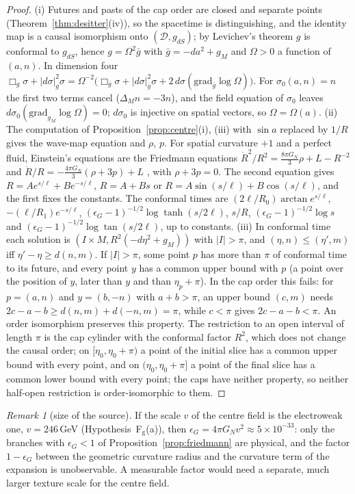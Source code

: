 \documentclass[aps,pra,onecolumn,superscriptaddress,nofootinbib,10pt]{revtex4-2}
\theoremstyle{definition}
\theoremstyle{remark}
\newtheorem{remark}[theorem]{Remark}
\newcommand{\cD}{\mathcal{D}}
\begin{document}
\begin{proof}
(i) Futures and pasts of the cap order are closed and separate points (Theorem~\ref{thm:desitter}(iv)), so the
spacetime is distinguishing, and the identity map is a causal isomorphism onto $(\cD,g_{dS})$; by Levichev's
theorem \cite{Levichev87} $g$ is conformal to $g_{dS}$, hence $g=\Omega^2\bar g$ with $\bar g=-da^2+g_M$ and $\Omega>0$ a
function of $(a,n)$.  In dimension four $\Box_g\sigma+\lvert d\sigma\rvert_g^2\sigma=\Omega^{-2}\bigl(\Box_{\bar g}\sigma+\lvert d\sigma\rvert_{\bar g}^2\sigma+2\,d\sigma(\mathrm{grad}_{\bar g}\log\Omega)\bigr)$.  For
$\sigma_0(a,n)=n$ the first two terms cancel ($\Delta_Mn=-3n$), and the field equation of $\sigma_0$ leaves
$d\sigma_0(\mathrm{grad}_{g_M}\log\Omega)=0$; $d\sigma_0$ is injective on spatial vectors, so $\Omega=\Omega(a)$.
(ii) The computation of Proposition~\ref{prop:centre}(i), (iii) with $\sin a$ replaced by $1/R$ gives the
wave-map equation and $\rho$, $p$.  For spatial curvature $+1$ and a perfect fluid, Einstein's equations
are the Friedmann equations $\dot R^2/R^2=\tfrac{8\pi G_N}3\rho+L-R^{-2}$ and
$\ddot R/R=-\tfrac{4\pi G_N}3(\rho+3p)+L$ \cite{HawkingEllis}, with $\rho+3p=0$.  The second equation gives
$R=Ae^{s/\ell}+Be^{-s/\ell}$, $R=A+Bs$ or $R=A\sin(s/\ell)+B\cos(s/\ell)$, and the first fixes the constants.  The
conformal times are $(2\ell/R_0)\arctan e^{s/\ell}$, $-(\ell/R_1)e^{-s/\ell}$, $(\epsilon_G-1)^{-1/2}\log\tanh(s/2\ell)$,
$s/R$, $(\epsilon_G-1)^{-1/2}\log s$ and $(\epsilon_G-1)^{-1/2}\log\tan(s/2\ell)$, up to constants.
(iii) In conformal time each solution is $(I\times M,R^2(-d\eta^2+g_M))$ with $\lvert I\rvert>\pi$, and $(\eta,n)\le(\eta',m)$ iff
$\eta'-\eta\ge d(n,m)$.  If $\lvert I\rvert>\pi$, some point $p$ has more than $\pi$ of conformal time to its future, and
every point $y$ has a common upper bound with $p$ (a point over the position of $y$, later than $y$ and than
$\eta_p+\pi$).  In the cap order this fails: for $p=(a,n)$ and $y=(b,-n)$ with $a+b>\pi$, an upper bound $(c,m)$
needs $2c-a-b\ge d(n,m)+d(-n,m)=\pi$, while $c<\pi$ gives $2c-a-b<\pi$.  An order isomorphism preserves this
property.  The restriction to an open interval of length $\pi$ is the cap cylinder with the conformal factor
$R^2$, which does not change the causal order; on $[\eta_0,\eta_0+\pi)$ a point of the initial
slice has a common upper bound with every point, and on $(\eta_0,\eta_0+\pi]$ a point of the final slice has a
common lower bound with every point; the caps have neither property, so neither half-open restriction is
order-isomorphic to them.
\end{proof}
\begin{remark}[size of the source]\label{rem:friedmannsize}
If the scale $v$ of the centre field is the electroweak one, $v=246$\,GeV (Hypothesis~F$_{\mathrm g}$(a)), then
$\epsilon_G=4\pi G_Nv^2\approx5\times10^{-33}$: only the branches with $\epsilon_G<1$ of Proposition~\ref{prop:friedmann} are physical, and the
factor $1-\epsilon_G$ between the geometric curvature radius and the curvature term of the expansion is unobservable.  A
measurable factor would need a separate, much larger texture scale for the centre field.
\end{remark}
\end{document}
